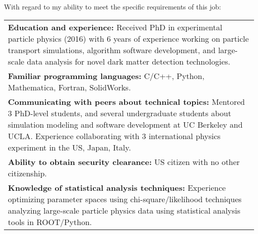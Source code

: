 \documentclass[11pt,letterpaper,sans]{moderncv}        %
\begin{document}
With regard to my ability to meet the specific requirements of this job:
\noindent\begin{tabularx}{\linewidth}{@{{}\textbullet\enskip}X@{\quad}@{}}
	\textbf{Education and experience:} Received PhD in experimental particle
	physics (2016) with 6 years of experience working on particle transport
	simulations, algorithm software development, and large-scale data analysis
	for novel dark matter detection technologies.\\
	\textbf{Familiar programming languages:} C/C++, Python, Mathematica, Fortran, SolidWorks.\\
	\textbf{Communicating with peers about technical topics:} Mentored 3
	PhD-level students, and several undergraduate students about simulation
	modeling and software development at UC Berkeley and UCLA. Experience
	collaborating with 3 international physics experiment in the
	US, Japan, Italy.\\
	\textbf{Ability to obtain security clearance:} US citizen with no other
	citizenship.\\
	\textbf{Knowledge of statistical analysis techniques:} Experience
	optimizing parameter spaces using chi-square/likelihood techniques
	analyzing large-scale particle physics data using statistical analysis
	tools in ROOT/Python.\\

\end{tabularx}
\end{document}
